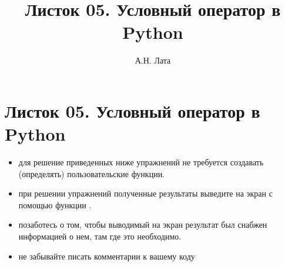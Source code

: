 \documentclass[a4,12pt]{article}
\title{Листок 05. Условный оператор в Python}
\author{А.Н. Лата}
\theoremstyle{remark}
\begin{document}
 


\section*{\centering Листок 05. Условный оператор в Python}

\begin{exercisenote}[title=Замечания]
\begin{itemize}
    \item для решение приведенных ниже упражнений не требуется создавать (определять) пользовательские функции.
    \item при решении упражнений полученные результаты выведите на экран с помощью функции {\color{blue}{print()}}.
    \item позаботесь о том, чтобы выводимый на экран результат был снабжен информацией о нем, там где это необходимо.
    \item не забывайте писать комментарии к вашему коду
\end{itemize}
\end{exercisenote}
\end{document}
